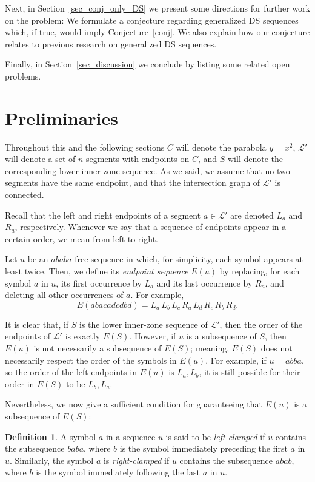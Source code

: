 \documentclass[11pt]{article}
\theoremstyle{definition}
\newtheorem{definition}[theorem]{Definition}
\theoremstyle{remark}
\begin{document}
Next, in Section~\ref{sec_conj_only_DS} we present some directions for further work on the problem: We formulate a conjecture regarding generalized DS sequences which, if true, would imply Conjecture~\ref{conj}. We also explain how our conjecture relates to previous research on generalized DS sequences.

Finally, in Section~\ref{sec_discussion} we conclude by listing some related open problems.

\section{Preliminaries}\label{sec_preliminaries}

Throughout this and the following sections $C$ will denote the parabola $y=x^2$, $\mathcal L'$ will denote a set of $n$ segments with endpoints on $C$, and $S$ will denote the corresponding lower inner-zone sequence. As we said, we assume that no two segments have the same endpoint, and that the intersection graph of $\mathcal L'$ is connected.

Recall that the left and right endpoints of a segment $a\in\mathcal L'$ are denoted $L_a$ and $R_a$, respectively. Whenever we say that a sequence of endpoints appear in a certain order, we mean from left to right.

Let $u$ be an $ababa$-free sequence in which, for simplicity, each symbol appears at least twice. Then, we define its \emph{endpoint sequence} $E(u)$ by replacing, for each symbol $a$ in $u$, its first occurrence by $L_a$ and its last occurrence by $R_a$, and deleting all other occurrences of $a$. For example,
\begin{equation*}
E(abacadcdbd) = L_a\, L_b\, L_c\, R_a\, L_d\, R_c\, R_b\, R_d.
\end{equation*}

It is clear that, if $S$ is the lower inner-zone sequence of $\mathcal L'$, then the order of the endpoints of $\mathcal L'$ is exactly $E(S)$. However, if $u$ is a subsequence of $S$, then $E(u)$ is not necessarily a subsequence of $E(S)$; meaning, $E(S)$ does not necessarily respect the order of the symbols in $E(u)$. For example, if $u=abba$, so the order of the left endpoints in $E(u)$ is $L_a, L_b$, it is still possible for their order in $E(S)$ to be $L_b, L_a$.

Nevertheless, we now give a sufficient condition for guaranteeing that $E(u)$ is a subsequence of $E(S)$:

\begin{definition}\label{def_clamped}
A symbol $a$ in a sequence $u$ is said to be \emph{left-clamped} if $u$ contains the subsequence $baba$, where $b$ is the symbol immediately preceding the first $a$ in $u$. Similarly, the symbol $a$ is \emph{right-clamped} if $u$ contains the subsequence $abab$, where $b$ is the symbol immediately following the last $a$ in $u$.
\end{definition}
\end{document}
